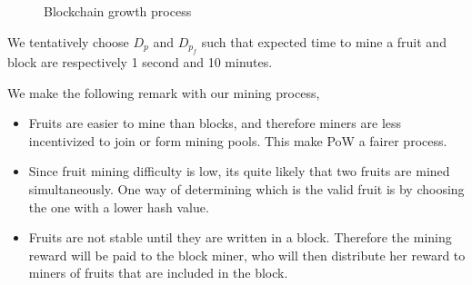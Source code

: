 \documentclass[9pt,oneside]{amsart}
\begin{document}
\begin{multicols}{2}
\begin{figure*}
\begin{algorithm}[H]
	
		\caption{Blockchain growth process}
	\end{algorithm}
\end{figure*}

We tentatively choose $D_p$ and $D_{p_f}$ such that expected time to mine a fruit and block are respectively 1 second and 10 minutes. 

We make the following remark with our mining process, 
\begin{itemize}
	\item Fruits are easier to mine than blocks, and therefore miners are less incentivized to join or form mining pools. This make PoW a fairer process. 
	
	\item Since fruit mining difficulty is low, its quite likely that two fruits are mined simultaneously. One way of determining which is the valid fruit is by choosing the one with a lower hash value. 
	
	\item Fruits are not stable until they are written in a block. Therefore the mining reward will be paid to the block miner, who will then distribute her reward to miners of fruits that are included in the block. 
	

\end{itemize}
\end{multicols}
\end{document}
